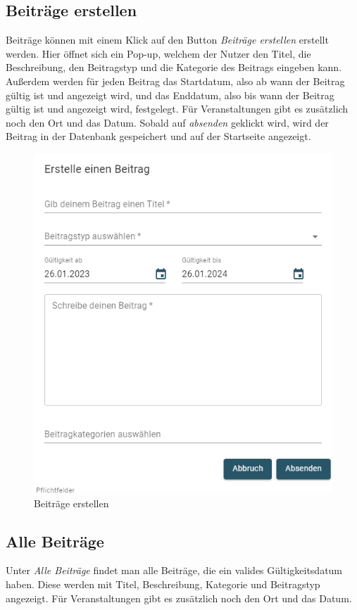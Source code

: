 \subsection{Beiträge erstellen}
\label{sec:createpost}

Beiträge können mit einem Klick auf den Button \textit{Beiträge erstellen} erstellt werden.
Hier öffnet sich ein Pop-up, welchem der Nutzer den Titel, die Beschreibung, den Beitragstyp und die Kategorie des Beitrags eingeben kann.
Außerdem werden für jeden Beitrag das Startdatum, also ab wann der Beitrag gültig ist und angezeigt wird, und das Enddatum, also bis wann der Beitrag gültig ist und angezeigt wird, festgelegt.
Für Veranstaltungen gibt es zusätzlich noch den Ort und das Datum.
Sobald auf \textit{absenden} geklickt wird, wird der Beitrag in der Datenbank gespeichert und auf der Startseite angezeigt.

\begin{figure}[ht!]
    \begin{centering}
        \includegraphics[width=.65\textwidth]{figures/implementation/createpost.png}
        \caption{Beiträge erstellen}
        \label{fig:createpost}
    \end{centering}
\end{figure}


\subsection{Alle Beiträge}
\label{sec:allposts}

Unter \textit{Alle Beiträge} findet man alle Beiträge, die ein valides Gültigkeitsdatum haben. Diese werden mit Titel, Beschreibung, Kategorie und Beitragstyp angezeigt.
Für Veranstaltungen gibt es zusätzlich noch den Ort und das Datum.

